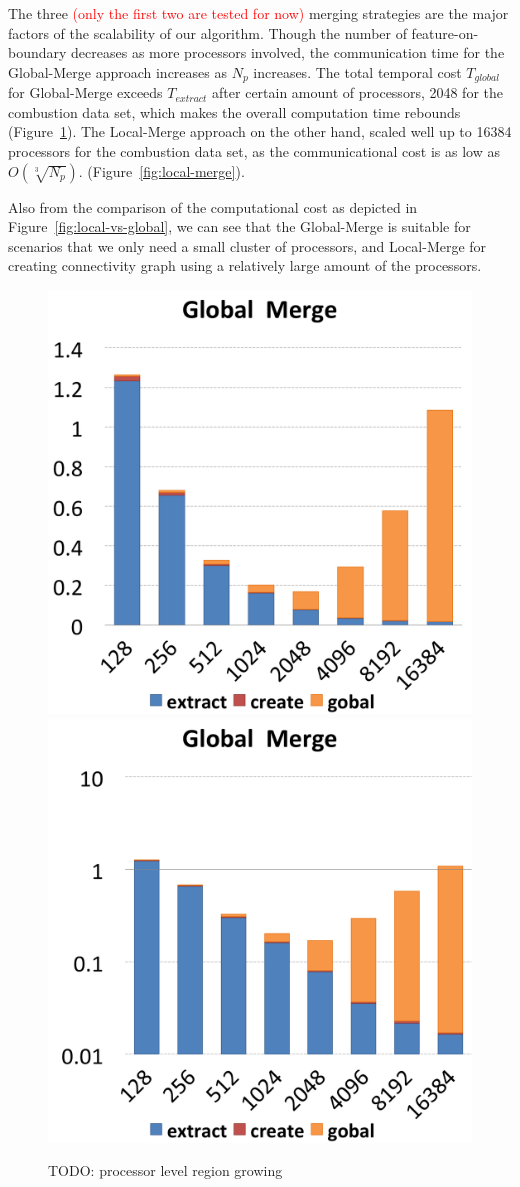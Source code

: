 \documentclass[10pt, conference, compsocconf]{IEEEtran}
\begin{document}
The three \textcolor{red}{(only the first two are tested for now)} merging strategies are the major factors of the scalability of our algorithm. Though the number of feature-on-boundary decreases as more processors involved, the communication time for the Global-Merge approach increases as $N_p$ increases. The total temporal cost $T_{global}$ for Global-Merge exceeds $T_{extract}$ after certain amount of processors, 2048 for the combustion data set, which makes the overall computation time rebounds (Figure~\ref{fig:global-merge}). The Local-Merge approach on the other hand, scaled well up to 16384 processors for the combustion data set, as the communicational cost is as low as ${O(\sqrt[3]{N_p})}$. (Figure~\ref{fig:local-merge}).

Also from the comparison of the computational cost as depicted in Figure~\ref{fig:local-vs-global}, we can see that the Global-Merge is suitable for scenarios that we only need a small cluster of processors, and Local-Merge for creating connectivity graph using a relatively large amount of the processors.

\begin{figure}[ht]
	\centering
	\includegraphics[width=0.45\linewidth]{global_merge.png}
	\includegraphics[width=0.45\linewidth]{global_merge_log.png}
	\caption{TODO: processor level region growing}
	\label{fig:global-merge}
\end{figure}
\end{document}
